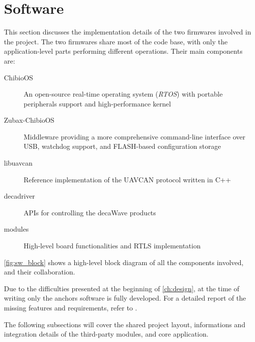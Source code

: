 \section{Software}\label{sec:software}

This section discusses the implementation details of the two firmwares involved in the project.
The two firmwares share most of the code base, with only the application-level parts performing different operations.
Their main components are:
\begin{description}
    \item[ChibioOS] An open-source real-time operating system (\emph{RTOS}) with portable peripherals support and high-performance kernel
    \item[Zubax-ChibioOS] Middleware providing a more comprehensive command-line interface over USB, watchdog support, and FLASH-based configuration storage
    \item[libuavcan] Reference implementation of the UAVCAN protocol written in C++
    \item[decadriver] APIs for controlling the decaWave products
    \item[modules] High-level board functionalities and RTLS implementation
\end{description}

\autoref{fig:sw_block} shows a high-level block diagram of all the components involved, and their collaboration.


Due to the difficulties presented at the beginning of \autoref{ch:design}, at the time of writing only the anchors software is fully developed.
For a detailed report of the missing features and requirements, refer to .

The following subsections will cover the shared project layout, informations and integration details of the third-party modules, and core application.









